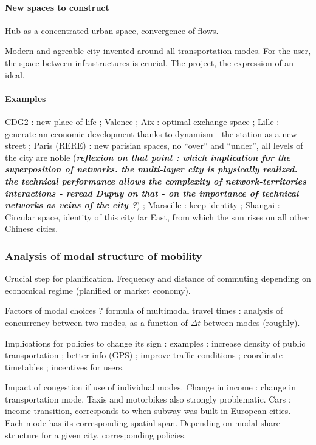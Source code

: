 \paragraph{New spaces to construct}

Hub as a concentrated urban space, convergence of flows.

Modern and agreable city invented around all transportation modes. For the user, the space between infrastructures is crucial. The project, the expression of an ideal.

\paragraph{Examples}

CDG2 : new place of life ; Valence ; Aix : optimal exchange space ; Lille : generate an economic development thanks to dynamism - the station as a new street ; Paris (RERE) : new parisian spaces, no ``over'' and ``under'', all levels of the city are noble (\textbf{\textit{reflexion on that point : which implication for the superposition of networks. the multi-layer city is physically realized. the technical performance allows the complexity of network-territories interactions - reread Dupuy on that - on the importance of technical networks as veins of the city ?}}) ; Marseille : keep identity ; Shangai : Circular space, identity of this city far East, from which the sun rises on all other Chinese cities.


\subsubsection{Analysis of modal structure of mobility}

Crucial step for planification. Frequency and distance of commuting depending on economical regime (planified or market economy).

Factors of modal choices ? formula of multimodal travel times : analysis of concurrency between two modes, as a function of $\Delta t$ between modes (roughly).

Implications for policies to change its sign : examples : increase density of public transportation ; better info (GPS) ; improve traffic conditions ; coordinate timetables ; incentives for users.

Impact of congestion if use of individual modes. Change in income : change in transportation mode. Taxis and motorbikes also strongly problematic. Cars : income transition, corresponds to when subway was built in European cities. Each mode has its corresponding spatial span. Depending on modal share structure for a given city, corresponding policies. 




